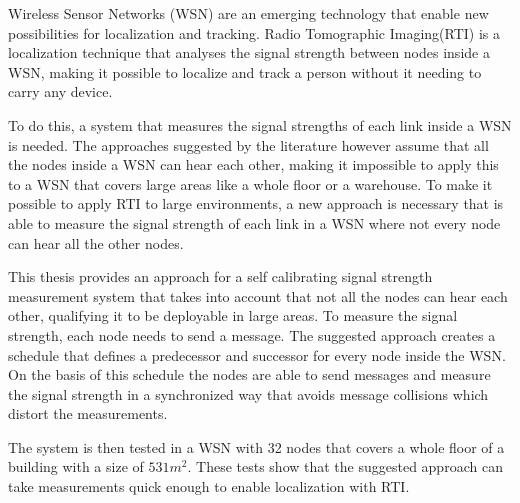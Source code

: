 Wireless Sensor Networks (WSN) are an emerging technology that enable new possibilities for localization and tracking. Radio Tomographic Imaging(RTI) is a localization technique that analyses the signal strength between nodes inside a WSN, making it possible to localize and track a person without it needing to carry any device.

To do this, a system that measures the signal strengths of each link inside a WSN is needed. The approaches suggested by the literature however assume that all the nodes inside a WSN can hear each other, making it impossible to apply this to a WSN that covers large areas like a whole floor or a warehouse.
To make it possible to apply RTI to large environments, a new approach is necessary that is able to measure the signal strength of each link in a WSN where not every node can hear all the other nodes. 

This thesis provides an approach for a self calibrating signal strength measurement system that takes into account that not all the nodes can hear each other, qualifying it to be deployable in large areas. To measure the signal strength, each node needs to send a message. The suggested approach creates a schedule that defines a predecessor and successor for every node inside the WSN. On the basis of this schedule the nodes are able to send messages and measure the signal strength in a synchronized way that avoids message collisions which distort the measurements.

The system is then tested in a WSN with 32 nodes that covers a whole floor of a building with a size of $531 m^2$. These tests show that the suggested approach can take measurements quick enough to enable localization with RTI.
\cleardoublepage
